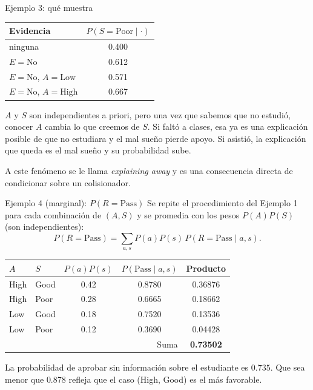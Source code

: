 \documentclass[11pt]{beamer}
\newcommand{\Pp}[1]{P\!\left(#1\right)}
\begin{document}
\begin{frame}{Ejemplo 3: qué muestra}
  \begin{center}
  \begin{tabular}{lc}
    \toprule
    Evidencia & $\Pp{S=\text{Poor}\mid\cdot}$ \\
    \midrule
    ninguna & 0.400 \\
    $E=\text{No}$ & 0.612 \\
    $E=\text{No}$, $A=\text{Low}$ & 0.571 \\
    $E=\text{No}$, $A=\text{High}$ & 0.667 \\
    \bottomrule
  \end{tabular}
  \end{center}

  \medskip
  $A$ y $S$ son independientes a priori, pero una vez que sabemos que no estudió, conocer $A$ cambia lo que creemos de $S$. Si faltó a clases, esa ya es una explicación posible de que no estudiara y el mal sueño pierde apoyo. Si asistió, la explicación que queda es el mal sueño y su probabilidad sube.

  \medskip
  A este fenómeno se le llama \emph{explaining away} y es una consecuencia directa de condicionar sobre un colisionador.
\end{frame}

\begin{frame}{Ejemplo 4 (marginal): $\Pp{R=\text{Pass}}$}
  Se repite el procedimiento del Ejemplo 1 para cada combinación de $(A,S)$ y se promedia con los pesos $\Pp{A}\Pp{S}$ (son independientes):
  \[
    \Pp{R=\text{Pass}}=\sum_{a,s}\Pp{a}\Pp{s}\,\Pp{R=\text{Pass}\mid a,s}.
  \]
  \small
  \begin{center}
  \begin{tabular}{llccc}
    \toprule
    $A$ & $S$ & $\Pp{a}\Pp{s}$ & $\Pp{\text{Pass}\mid a,s}$ & Producto \\
    \midrule
    High & Good & 0.42 & 0.8780 & 0.36876 \\
    High & Poor & 0.28 & 0.6665 & 0.18662 \\
    Low  & Good & 0.18 & 0.7520 & 0.13536 \\
    Low  & Poor & 0.12 & 0.3690 & 0.04428 \\
    \midrule
    \multicolumn{4}{r}{Suma} & \textbf{0.73502} \\
    \bottomrule
  \end{tabular}
  \end{center}
  \normalsize
  La probabilidad de aprobar sin información sobre el estudiante es $0.735$. Que sea menor que $0.878$ refleja que el caso (High, Good) es el más favorable.
\end{frame}
\end{document}
